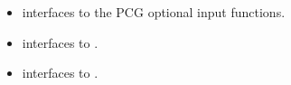 \documentclass[letterpaper,10pt,english]{sphinxmanual}
\begin{document}
\begin{itemize}
\item {} 
{\hyperref[f_interface/Usage:f/_/FARKPCGREINIT]{\emph{}}} interfaces to the PCG optional input
functions.

\item {} 
{\hyperref[f_interface/Usage:f/_/FARKSPILSSETJAC]{\emph{}}} interfaces to {\hyperref[c_interface/User_callable:c.ARKSpilsSetJacTimesVecFn]{\emph{}}}.

\item {} 
{\hyperref[f_interface/Usage:f/_/FARKSPILSSETPREC]{\emph{}}} interfaces to {\hyperref[c_interface/User_callable:c.ARKSpilsSetPreconditioner]{\emph{}}}.

\end{itemize}
\end{document}
